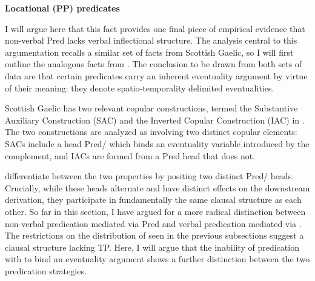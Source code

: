 \documentclass[12pt]{article}
\begin{document}
\bex
\ex \textbf{Locational (PP) predicates} \label{type1}
\bxl
\fxl
\fex

I will argue here that this fact provides one final piece of empirical evidence that non-verbal Pred  lacks verbal inflectional structure. The analysis central to this argumentation recalls a similar set of facts from Scottish Gaelic, so I will first outline the analogous facts from \citet{adger-ramchand-2003}. The conclusion to be drawn from both sets of data are that certain predicates carry an inherent eventuality argument by virtue of their meaning: they denote spatio-temporality delimited eventualities.

Scottish Gaelic has two relevant copular constructions, termed the Substantive Auxiliary Construction (SAC) and the Inverted Copular Construction (IAC) in \citet{adger-ramchand-2003}. The two constructions are analyzed as involving two distinct copular elements: SACs include a head Pred/ which binds an eventuality variable introduced by the complement, and IACs are formed from a Pred head that does not.

\bex
\ex {}
\bxl
{}
\fxl
\fex

\citet{adger-ramchand-2003} differentiate between the two properties by positing two distinct Pred/ heads. Crucially, while these heads alternate and have distinct effects on the downstream derivation, they participate in fundamentally the same clausal structure as each other. So far in this section, I have argued for a more radical distinction between non-verbal predication mediated via Pred and verbal predication mediated via . The restrictions on the distribution of  seen in the previous subsections suggest a clausal structure lacking TP. Here, I will argue that the inability of predication with  to bind an eventuality argument shows a further distinction between the two predication strategies.
\end{document}
